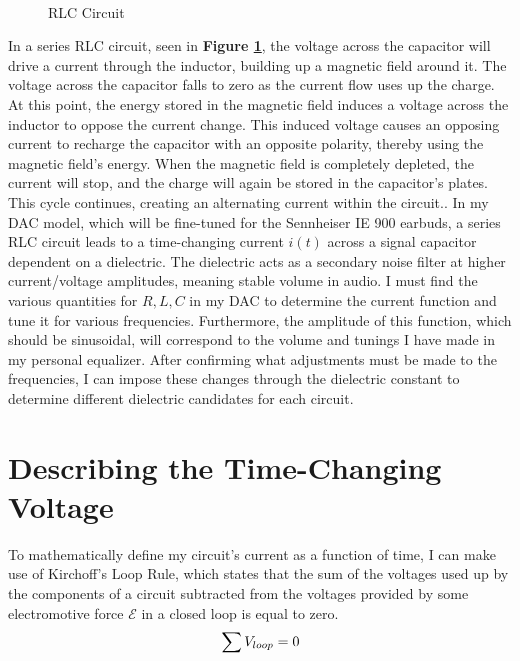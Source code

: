 \documentclass[12pt]{article}
\numberwithin{equation}{section}
\newcommand{\midlabelline}[3]{
   \node (midlabel) at ($ (#1)!.5!(#2) $) {#3};
   \draw[latex-] (#1) --  (midlabel);
   \draw[-latex] (midlabel) -- (#2);
}
\begin{document}
\FloatBarrier
\begin{figure}[h!]\
    \centering
    \caption{RLC Circuit}
    \label{fig:MyModel}
\end{figure}
\FloatBarrier
\noindent In a series RLC circuit, seen in \textbf{Figure \ref{fig:MyModel}}, the voltage across the capacitor will drive a current through the inductor, building up a magnetic field around it. The voltage across the capacitor falls to zero as the current flow uses up the charge. At this point, the energy stored in the magnetic field induces a voltage across the inductor to oppose the current change. This induced voltage causes an opposing current to recharge the capacitor with an opposite polarity, thereby using the magnetic field's energy. When the magnetic field is completely depleted, the current will stop, and the charge will again be stored in the capacitor's plates. This cycle continues, creating an alternating current within the circuit.. In my DAC model, which will be fine-tuned for the Sennheiser IE 900 earbuds, a series RLC circuit leads to a time-changing current $i(t)$ across a signal capacitor dependent on a dielectric. The dielectric acts as a secondary noise filter at higher current/voltage amplitudes, meaning stable volume in audio. I must find the various quantities for $R,L,C$ in my DAC to determine the current function and tune it for various frequencies. Furthermore, the amplitude of this function, which should be sinusoidal, will correspond to the volume and tunings I have made in my personal equalizer. After confirming what adjustments must be made to the frequencies, I can impose these changes through the dielectric constant to determine different dielectric candidates for each circuit.


\section{Describing the Time-Changing Voltage}
To mathematically define my circuit's current as a function of time, I can make use of Kirchoff's Loop Rule, which states that the sum of the voltages used up by the components of a circuit subtracted from the voltages provided by some electromotive force $\mathcal{E}$ in a closed loop is equal to zero.
\begin{equation}{\label{eq:kirchofflaw}}
    \sum V_{loop} = 0 
\end{equation}
\end{document}
